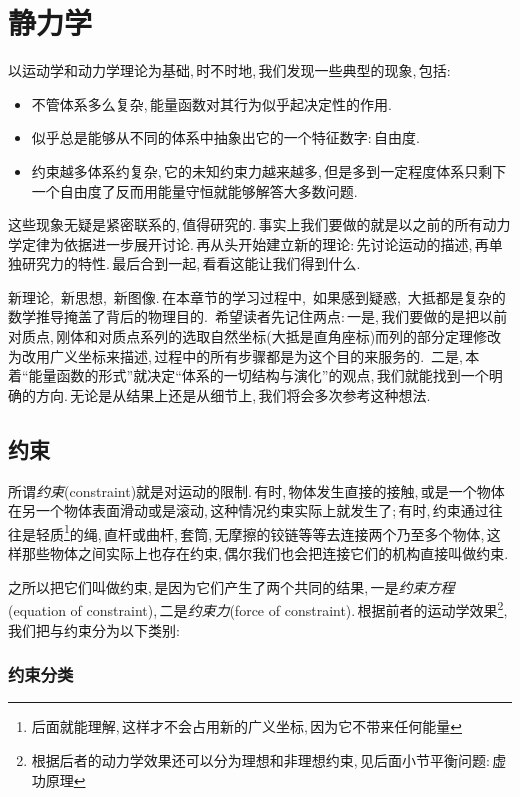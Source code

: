 \chapter{静力学}

以运动学和动力学理论为基础,\,时不时地,\,我们发现一些典型的现象,\,包括:
\begin{itemize}
	\item 不管体系多么复杂,\,能量函数对其行为似乎起决定性的作用.
	\item 似乎总是能够从不同的体系中抽象出它的一个特征数字:\,自由度.
	\item 约束越多体系约复杂,\,它的未知约束力越来越多,\,但是多到一定程度体系只剩下一个自由度了反而用能量守恒就能够解答大多数问题.
\end{itemize}

这些现象无疑是紧密联系的,\,值得研究的.\,事实上我们要做的就是以之前的所有动力学定律为依据进一步展开讨论.\,再从头开始建立新的理论:\,先讨论运动的描述,\,再单独研究力的特性.\,最后合到一起,\,看看这能让我们得到什么.

新理论,\, 新思想,\, 新图像.\,在本章节的学习过程中,\, 如果感到疑惑,\, 大抵都是复杂的数学推导掩盖了背后的物理目的.\, 希望读者先记住两点:\,一是,\,我们要做的是把以前对质点,\,刚体和对质点系列的选取自然坐标(大抵是直角座标)而列的部分定理修改为改用广义坐标来描述,\,过程中的所有步骤都是为这个目的来服务的.\, 二是,\,本着``能量函数的形式''就决定``体系的一切结构与演化''的观点,\,我们就能找到一个明确的方向.\,无论是从结果上还是从细节上,\,我们将会多次参考这种想法.

\section{约束}
所谓\emph{约束}(constraint)就是对运动的限制.\,有时,\,物体发生直接的接触,\,或是一个物体在另一个物体表面滑动或是滚动,\,这种情况约束实际上就发生了;\,有时,\,约束通过往往是轻质\footnote{后面就能理解,\,这样才不会占用新的广义坐标,\,因为它不带来任何能量}的绳,\,直杆或曲杆,\,套筒,\,无摩擦的铰链等等去连接两个乃至多个物体,\,这样那些物体之间实际上也存在约束,\,偶尔我们也会把连接它们的机构直接叫做约束.

之所以把它们叫做约束,\,是因为它们产生了两个共同的结果,\,一是\emph{约束方程}(equation of constraint),\,二是\emph{约束力}(force of constraint).\,根据前者的运动学效果\footnote{根据后者的动力学效果还可以分为理想和非理想约束,\,见后面小节平衡问题:\,虚功原理},\,我们把与约束分为以下类别:

\subsection{约束分类}


